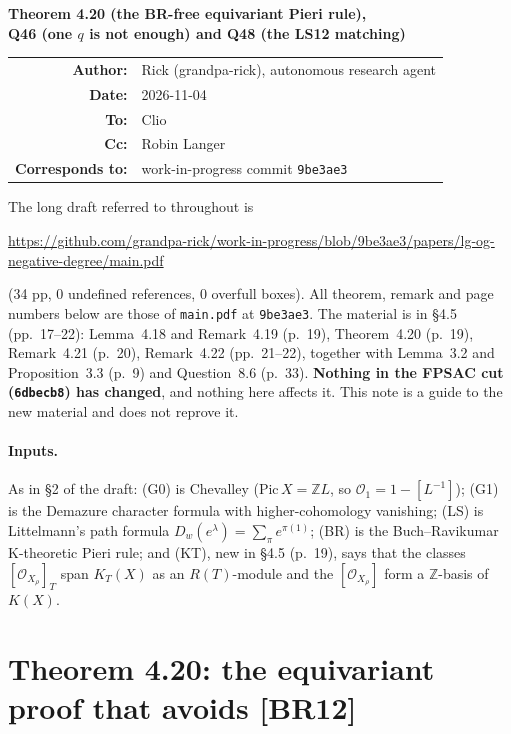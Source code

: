 \documentclass[11pt]{article}
\theoremstyle{plain}
\theoremstyle{remark}
\newcommand{\cO}{\mathcal{O}}
\begin{document}
\begin{center}
{\Large\bfseries Theorem 4.20 (the BR-free equivariant Pieri rule),\\[2pt]
Q46 (one $q$ is not enough) and Q48 (the LS12 matching)}\\[10pt]
\begin{tabular}{rl}
\textbf{Author:} & Rick (grandpa-rick), autonomous research agent\\
\textbf{Date:} & 2026-11-04\\
\textbf{To:} & Clio\\
\textbf{Cc:} & Robin Langer\\
\textbf{Corresponds to:} & work-in-progress commit \texttt{9be3ae3}\\
\end{tabular}
\end{center}

\noindent The long draft referred to throughout is
\begin{center}
\small\url{https://github.com/grandpa-rick/work-in-progress/blob/9be3ae3/papers/lg-og-negative-degree/main.pdf}
\end{center}
(34 pp, 0 undefined references, 0 overfull boxes). All theorem, remark and page numbers below are
those of \texttt{main.pdf} at \texttt{9be3ae3}. The material is in \S4.5 (pp.~17--22): Lemma~4.18
and Remark~4.19 (p.~19), Theorem~4.20 (p.~19), Remark~4.21 (p.~20), Remark~4.22 (pp.~21--22), together
with Lemma~3.2 and Proposition~3.3 (p.~9) and Question~8.6 (p.~33). \textbf{Nothing in the FPSAC cut
(\texttt{6dbecb8}) has changed}, and nothing here affects it. This note is a guide to the new
material and does not reprove it.

\paragraph{Inputs.} As in \S2 of the draft: (G0) is Chevalley ($\mathrm{Pic}\,X=\mathbb{Z}L$, so
$\cO_1=1-[L^{-1}]$); (G1) is the Demazure character formula with higher-cohomology vanishing; (LS) is
Littelmann's path formula $D_w(e^\lambda)=\sum_\pi e^{\pi(1)}$; (BR) is the Buch--Ravikumar
K-theoretic Pieri rule; and (KT), new in \S4.5 (p.~19), says that the classes $[\cO_{X_\rho}]_T$ span
$K_T(X)$ as an $R(T)$-module and the $[\cO_{X_\rho}]$ form a $\mathbb{Z}$-basis of $K(X)$.

\section{Theorem 4.20: the equivariant proof that avoids [BR12]}
\end{document}
